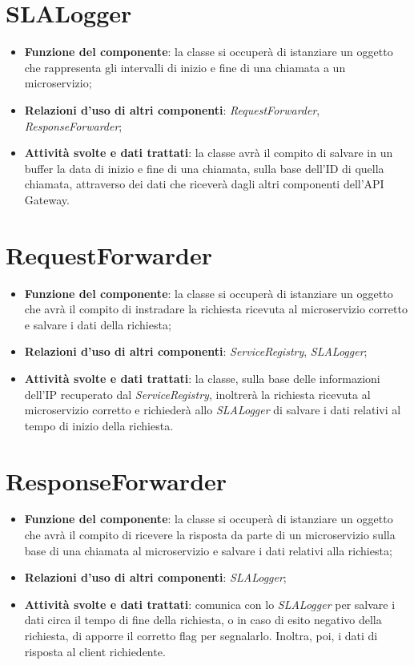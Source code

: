 \chapter{SLALogger}
\begin{itemize}
	\item \textbf{Funzione del componente}: la classe si occuper\`{a} di istanziare un oggetto che rappresenta gli intervalli di inizio e fine di una chiamata a un microservizio;
	\item \textbf{Relazioni d'uso di altri componenti}: \textit{RequestForwarder}, \textit{ResponseForwarder};
	\item \textbf{Attivit\`{a} svolte e dati trattati}:  la classe avr\`{a} il compito di salvare in un buffer la data di inizio e fine di una chiamata, sulla base dell'ID di quella chiamata, attraverso dei dati che ricever\`{a} dagli altri componenti dell'API Gateway.	
\end{itemize}

\chapter{RequestForwarder}
\begin{itemize}
	\item \textbf{Funzione del componente}: la classe si occuper\`{a} di istanziare un oggetto che avr\`{a} il compito di instradare la richiesta ricevuta al microservizio corretto e salvare i dati della richiesta;
		\item \textbf{Relazioni d'uso di altri componenti}: \textit{ServiceRegistry}, \textit{SLALogger};
		\item \textbf{Attivit\`{a} svolte e dati trattati}: la classe, sulla base delle informazioni dell'IP recuperato dal \textit{ServiceRegistry}, inoltrer\`{a} la richiesta ricevuta al microservizio corretto e richieder\`{a} allo \textit{SLALogger} di salvare i dati relativi al tempo di inizio della richiesta.
\end{itemize}

\chapter{ResponseForwarder}
\begin{itemize}
	\item \textbf{Funzione del componente}: la classe si occuper\`{a} di istanziare un oggetto che avr\`{a} il compito di ricevere la risposta da parte di un microservizio sulla base di una chiamata al microservizio e salvare i dati relativi alla richiesta;
	\item \textbf{Relazioni d'uso di altri componenti}: \textit{SLALogger};
	\item \textbf{Attivit\`{a} svolte e dati trattati}: comunica con lo \textit{SLALogger} per salvare i dati circa il tempo di fine della richiesta, o in caso di esito negativo della richiesta, di apporre il corretto flag per segnalarlo. Inoltra, poi, i dati di risposta al client richiedente.
\end{itemize}

